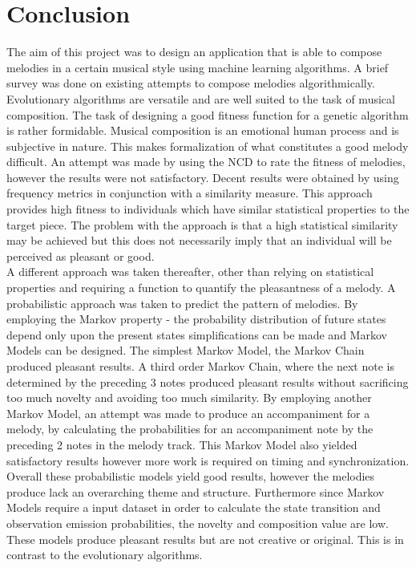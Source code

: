 \chapter{Conclusion}
The aim of this project was to design an application that is able to compose melodies in a certain musical style using machine learning algorithms. A brief survey was done on existing attempts to compose melodies algorithmically.
\\

Evolutionary algorithms are versatile and are well suited to the task of musical composition. The task of designing a good fitness function for a genetic algorithm is rather formidable.
Musical composition is an emotional human process and is subjective in nature. This makes formalization of what constitutes a good melody difficult. 
An attempt was made by using the \ac{NCD} to rate the fitness of melodies, however the results were not satisfactory.
Decent results were obtained by using frequency metrics in conjunction with a similarity measure. This approach provides high fitness to individuals which have similar statistical properties to the target piece. The problem with the approach is that a high statistical similarity may be achieved but this does not necessarily imply that an individual will be perceived as pleasant or good.
\\

A different approach was taken thereafter, other than relying on statistical properties and requiring a function to quantify the pleasantness of a melody. A probabilistic approach was taken to predict the pattern of melodies. By employing the Markov property - the probability distribution of future states depend only upon the present states simplifications can be made and Markov Models can be designed. The simplest Markov Model, the Markov Chain produced pleasant results. A third order Markov Chain, where the next note is determined by the preceding 3 notes produced pleasant results without sacrificing too much novelty and avoiding too much similarity. By employing another Markov Model, an attempt was made to produce an accompaniment for a melody, by calculating the probabilities for an accompaniment note by the preceding 2 notes in the melody track. This Markov Model also yielded satisfactory results however more work is required on timing and synchronization.
Overall these probabilistic models yield good results, however the melodies produce lack an overarching theme and structure. Furthermore since Markov Models require a input dataset in order to calculate the state transition and observation emission probabilities, the novelty and composition value are low. These models produce pleasant results but are not creative or original. This is in contrast to the evolutionary algorithms.
\\

